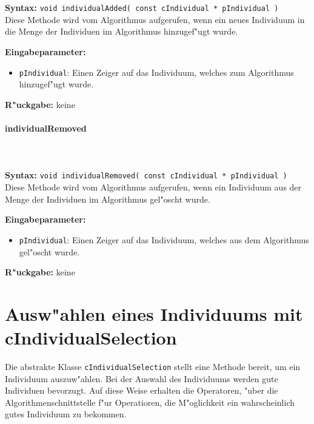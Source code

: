 \ \\\\\noindent
\textbf{Syntax:} \verb|void individualAdded( const cIndividual * pIndividual )| \\

Diese Methode wird vom Algorithmus aufgerufen, wenn ein neues Individuum in die Menge der Individuen im Algorithmus hinzugef"ugt wurde.

\bigskip\noindent
\textbf{Eingabeparameter:}
\begin{itemize}
 \item \verb|pIndividual|: Einen Zeiger auf das Individuum, welches zum Algorithmus hinzugef"ugt wurde.
\end{itemize}

\bigskip\noindent
\textbf{R"uckgabe:} keine


\paragraph{individualRemoved}

\ \\\\\noindent
\textbf{Syntax:} \verb|void individualRemoved( const cIndividual * pIndividual )| \\

Diese Methode wird vom Algorithmus aufgerufen, wenn ein Individuum aus der Menge der Individuen im Algorithmus gel"oscht wurde.

\bigskip\noindent
\textbf{Eingabeparameter:}
\begin{itemize}
 \item \verb|pIndividual|: Einen Zeiger auf das Individuum, welches aus dem Algorithmus gel"oscht wurde.
\end{itemize}

\bigskip\noindent
\textbf{R"uckgabe:} keine



\section{Ausw"ahlen eines Individuums mit cIndividualSelection}
\label{secIndividualSelection}

Die abstrakte Klasse \verb|cIndividualSelection| stellt eine Methode bereit, um ein Individuum auszuw"ahlen. Bei der Auswahl des Individuums werden gute Individuen bevorzugt.
Auf diese Weise erhalten die Operatoren, "uber die Algorithmenschnittstelle f"ur Operatioren, die M"oglichkeit ein wahrscheinlich gutes Individuum zu bekommen.

